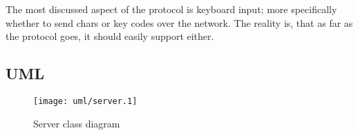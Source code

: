 The most discussed aspect of the protocol is keyboard input; more specifically
whether to send chars or key codes over the network. The reality is, that as far
as the protocol goes, it should easily support either.

\subsection{UML}

\begin{figure}[!h]
  \texttt{[image: uml/server.1]}
  \caption{Server class diagram}
  \label{fig:serverClassDiagram}
\end{figure}
